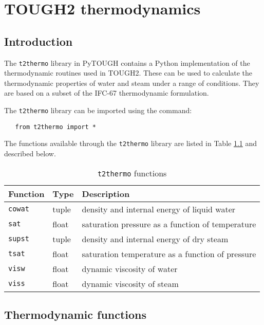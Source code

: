 \chapter{TOUGH2 thermodynamics}
\label{t2thermo}

\section{Introduction}
The \texttt{t2thermo} library in PyTOUGH contains a Python implementation of the thermodynamic routines used in TOUGH2.  These can be used to calculate the thermodynamic properties of water and steam under a range of conditions.  They are based on a subset of the IFC-67 thermodynamic formulation.

The \texttt{t2thermo} library can be imported using the command:

\begin{verbatim} 
   from t2thermo import *
\end{verbatim}

The functions available through the \texttt{t2thermo} library are listed in Table \ref{tb:t2thermo_functions} and described below.

\begin{table}
  \begin{center}
    \begin{tabular}{|l|l|p{65mm}|}
      \hline
      \textbf{Function} & \textbf{Type} & \textbf{Description}\\
      \hline
      \texttt{cowat} & tuple & density and internal energy of liquid water\\
      \texttt{sat} & float & saturation pressure as a function of temperature\\
      \texttt{supst} & tuple & density and internal energy of dry steam\\
      \texttt{tsat} & float & saturation temperature as a function of pressure\\
      \texttt{visw} & float & dynamic viscosity of water\\
      \texttt{viss} & float & dynamic viscosity of steam\\
      \hline
    \end{tabular}
    \caption{\texttt{t2thermo} functions}
    \label{tb:t2thermo_functions}
  \end{center}
\end{table}

\section{Thermodynamic functions}

